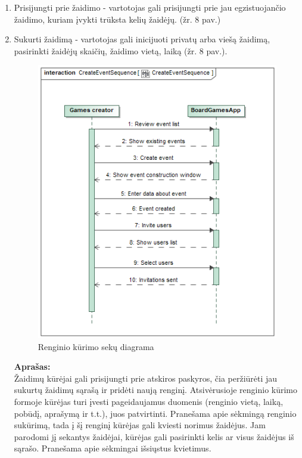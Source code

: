 \documentclass{VUMIFPSkursinis}
\begin{document}
			\begin{enumerate}
			\item Prisijungti prie žaidimo - vartotojas gali prisijungti prie 
				jau egzistuojančio žaidimo, kuriam įvykti trūksta kelių žaidėjų. (žr. 8 pav.)			
			\item Sukurti žaidimą - vartotojas gali inicijuoti privatų arba viešą 
			žaidimą, pasirinkti žaidėjų skaičių, žaidimo vietą, laiką (žr. 8 pav.).
				\begin{figure}[H]
					\centering
					\includegraphics[scale=0.5]{img/CreateEventSequence}
					\caption{Renginio kūrimo sekų diagrama}
					\label{img:CreateEventSequence}
				\end{figure}
				\textbf{Aprašas:}\\
					Žaidimų kūrėjai gali prisijungti prie atskiros paskyros, čia 
					peržiūrėti jau sukurtų žaidimų sąrašą ir pridėti naują renginį. 
					Atsivėrusioje renginio kūrimo formoje kūrėjas turi įvesti 
					pageidaujamus duomenis (renginio vietą, laiką, pobūdį, aprašymą 
					ir t.t.), juos  patvirtinti. Pranešama apie sėkmingą renginio 
					sukūrimą, tada į šį renginį kūrėjas gali kviesti norimus 
					žaidėjus. Jam parodomi jį sekantys žaidėjai, kūrėjas gali 
					pasirinkti kelis ar visus žaidėjus iš sąrašo. Pranešama apie 
					sėkmingai išsiųstus kvietimus.											
			\end{enumerate}		
			
\end{document}
